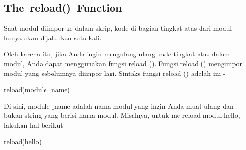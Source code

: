 \documentclass[a4paper,12pt]{report}
\begin{document}
\subsection*{The reload() Function}
 \par
\begin{adjustwidth}{0.03in}{0.03in}
Saat modul diimpor ke dalam skrip, kode di bagian tingkat atas dari modul hanya akan dijalankan satu kali.\end{adjustwidth}
 \par
\begin{adjustwidth}{0.03in}{0.03in}
Oleh karena itu, jika Anda ingin mengulang ulang kode tingkat atas dalam modul, Anda dapat menggunakan fungsi reload (). Fungsi reload () mengimpor modul yang sebelumnya diimpor lagi. Sintaks fungsi reload () adalah ini -\end{adjustwidth}
 \par
\noindent 
 \hspace*{0.5in} reload(module $  \_  $name) \par
\begin{adjustwidth}{0.03in}{0.03in}
Di sini, module $  \_  $name adalah nama modul yang ingin Anda muat ulang dan bukan string yang berisi nama modul. Misalnya, untuk me-reload modul hello, lakukan hal berikut -\end{adjustwidth}
 \par
\noindent 
 \hspace*{0.5in} reload(hello) \par
\vspace{20pt}
\end{document}
